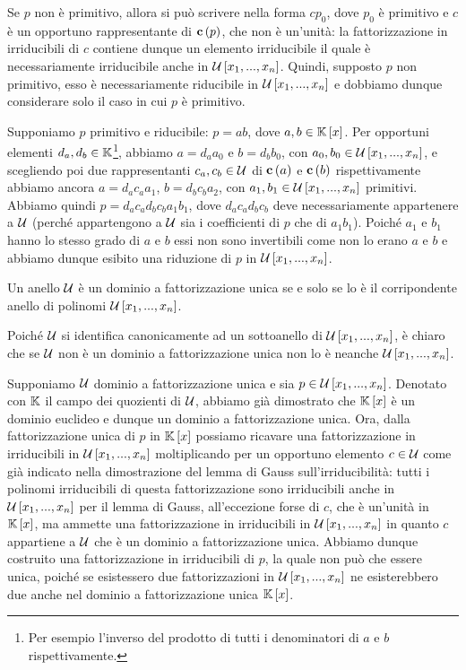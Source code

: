\par Se $p$ non \`e primitivo, allora si pu\`o scrivere nella forma $c p_0$, dove $p_0$ \`e primitivo e $c$ \`e un opportuno rappresentante di $\mathbf{c}\left ( p \right )$, che non \`e un'unit\`a: la fattorizzazione in irriducibili di $c$ contiene dunque un elemento irriducibile il quale \`e necessariamente irriducibile anche in $\mathcal{U} \left [ x_1, ..., x_n \right ]$. Quindi, supposto $p$ non primitivo, esso \`e necessariamente riducibile in $\mathcal{U} \left [ x_1, ..., x_n \right ]$ e dobbiamo dunque considerare solo il caso in cui $p$ \`e primitivo.
\par Supponiamo $p$ primitivo e riducibile: $p = ab$, dove $a,b \in \mathbb{K} \left [ x \right ]$. Per opportuni elementi $d_a, d_b \in \mathbb{K}$\footnote{Per esempio l'inverso del prodotto di tutti i denominatori di $a$ e $b$ rispettivamente.}, abbiamo $a = d_a a_0$ e $b = d_b b_0$, con $a_0, b_0 \in \mathcal{U} \left [ x_1, ..., x_n \right ]$, e scegliendo poi due rappresentanti $c_a, c_b \in \mathcal{U}$ di $\mathbf{c}\left ( a \right )$ e $\mathbf{c}\left ( b \right )$ rispettivamente abbiamo ancora $a = d_a c_a a_1$, $b = d_b c_b a_2$, con $a_1, b_1 \in \mathcal{U} \left [ x_1, ..., x_n \right ]$ primitivi. Abbiamo quindi $p = d_a c_a d_b c_b a_1 b_1$, dove $d_a c_a d_b c_b$ deve necessariamente appartenere a $\mathcal{U}$ (perch\'e appartengono a $\mathcal{U}$ sia i coefficienti di $p$ che di $a_1b_1$). Poich\'e $a_1$ e $b_1$ hanno lo stesso grado di $a$ e $b$ essi non sono invertibili come non lo erano $a$ e $b$ e abbiamo dunque esibito una riduzione di $p$ in $\mathcal{U} \left [ x_1, ..., x_n \right ]$. \EndProof
\begin{Theorem}
	Un anello $\mathcal{U}$ \`e un dominio a fattorizzazione unica se e solo se lo \`e il corripondente anello di polinomi $\mathcal{U} \left [ x_1, ..., x_n \right ]$.
\end{Theorem}
\Proof Poich\'e $\mathcal{U}$ si identifica canonicamente ad un sottoanello di $\mathcal{U} \left [ x_1, ..., x_n \right ]$, \`e chiaro che se $\mathcal{U}$ non \`e un dominio a fattorizzazione unica non lo \`e neanche $\mathcal{U} \left [ x_1, ..., x_n \right ]$.
\par Supponiamo $\mathcal{U}$ dominio a fattorizzazione unica e sia $p \in \mathcal{U} \left [ x_1, ..., x_n \right ]$. Denotato con $\mathbb{K}$ il campo dei quozienti di $\mathcal{U}$, abbiamo gi\`a dimostrato che $\mathbb{K} \left [ x \right ]$ \`e un dominio euclideo e dunque un dominio a fattorizzazione unica. Ora, dalla fattorizzazione unica di $p$ in $\mathbb{K} \left [ x \right ]$ possiamo ricavare una fattorizzazione in irriducibili in $\mathcal{U} \left [ x_1, ..., x_n \right ]$ moltiplicando per un opportuno elemento $c \in \mathcal{U}$ come gi\`a indicato nella dimostrazione del lemma di Gauss sull'irriducibilit\`a: tutti i polinomi irriducibili di questa fattorizzazione sono irriducibili anche in $\mathcal{U} \left [ x_1, ..., x_n \right ]$ per il lemma di Gauss, all'eccezione forse di $c$, che \`e un'unit\`a in $\mathbb{K} \left [ x \right ]$, ma ammette una fattorizzazione in irriducibili in $\mathcal{U} \left [ x_1, ..., x_n \right ]$ in quanto $c$ appartiene a $\mathcal{U}$ che \`e un dominio a fattorizzazione unica. Abbiamo dunque costruito una fattorizzazione in irriducibili di $p$, la quale non pu\`o che essere unica, poich\'e se esistessero due fattorizzazioni in $\mathcal{U} \left [ x_1, ..., x_n \right ]$ ne esisterebbero due anche nel dominio a fattorizzazione unica $\mathbb{K} \left [ x \right ]$. \EndProof
